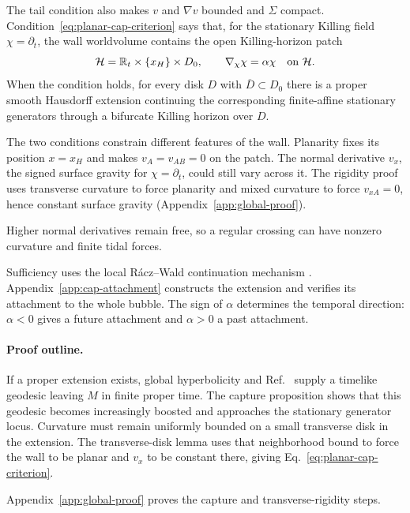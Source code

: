 \documentclass[10pt]{article}
\begin{document}
The tail condition also makes \(v\) and \(\nabla v\) bounded and
\(\Sigma\) compact.
Condition~\eqref{eq:planar-cap-criterion} says that, for the stationary
Killing field \(\chi=\partial_t\), the wall
worldvolume contains the open Killing-horizon patch
\begin{equation}
  \mathcal H=\mathbb R_t\times\{x_H\}\times D_0,
  \qquad
  \nabla_\chi\chi=\alpha\chi
  \quad\hbox{on }\mathcal H .
  \label{eq:forced-killing-horizon}
\end{equation}
When the condition holds, for every disk \(D\) with
\(\overline D\subset D_0\) there is a proper smooth Hausdorff extension
continuing the corresponding finite-affine stationary generators through a
bifurcate Killing horizon over \(D\).

The two conditions constrain different features of the wall.  Planarity
fixes its position \(x=x_H\) and makes \(v_A=v_{AB}=0\) on the patch.
The normal derivative \(v_x\), the signed surface gravity for
\(\chi=\partial_t\), could still vary across it.  The rigidity proof uses
transverse curvature to force planarity and mixed curvature to force
\(v_{xA}=0\), hence constant surface gravity
(Appendix~\ref{app:global-proof}).

Higher normal derivatives remain free, so a regular crossing can have
nonzero curvature and finite tidal forces.

Sufficiency uses the local R\'acz--Wald continuation mechanism
\cite{RaczWald1992,RaczWald1996}.  Appendix~\ref{app:cap-attachment}
constructs the extension and verifies its attachment to the whole bubble.
The sign of \(\alpha\) determines the temporal direction: \(\alpha<0\) gives a future
attachment and \(\alpha>0\) a past attachment.

\paragraph{Proof outline.}
If a proper extension exists, global hyperbolicity and
Ref.~\cite[Theorem~2]{GallowayLingSbierski2018} supply a timelike geodesic
leaving \(M\) in finite proper time.  The capture proposition shows that
this geodesic becomes increasingly boosted and approaches the stationary
generator locus.  Curvature must remain uniformly bounded on a small
transverse disk in the extension.  The transverse-disk lemma uses that
neighborhood bound to force the wall to be planar and \(v_x\) to be
constant there, giving Eq.~\eqref{eq:planar-cap-criterion}.

Appendix~\ref{app:global-proof} proves the capture and transverse-rigidity
steps.
\end{document}

